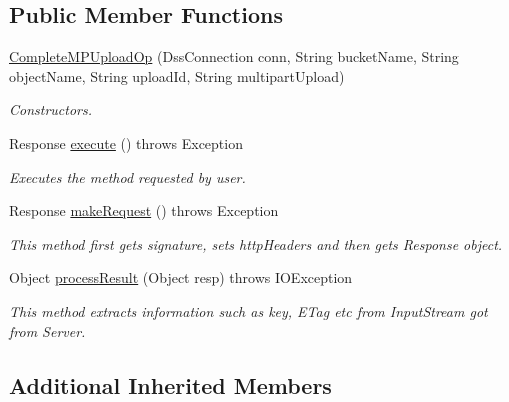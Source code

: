 \subsection*{Public Member Functions}
\begin{DoxyCompactItemize}
\item 
\hyperlink{classorg_1_1jcs_1_1dss_1_1op_1_1CompleteMPUploadOp_a8736c298c1dca59b038fd44ef2eec39a}{Complete\+M\+P\+Upload\+Op} (Dss\+Connection conn, String bucket\+Name, String object\+Name, String upload\+Id, String multipart\+Upload)\hypertarget{classorg_1_1jcs_1_1dss_1_1op_1_1CompleteMPUploadOp_a8736c298c1dca59b038fd44ef2eec39a}{}\label{classorg_1_1jcs_1_1dss_1_1op_1_1CompleteMPUploadOp_a8736c298c1dca59b038fd44ef2eec39a}

\begin{DoxyCompactList}\small\item\em Constructors. \end{DoxyCompactList}\item 
Response \hyperlink{classorg_1_1jcs_1_1dss_1_1op_1_1CompleteMPUploadOp_a24540ef77bd0fb6424888b3a6ea2b223}{execute} ()  throws Exception 
\begin{DoxyCompactList}\small\item\em Executes the method requested by user. \end{DoxyCompactList}\item 
Response \hyperlink{classorg_1_1jcs_1_1dss_1_1op_1_1CompleteMPUploadOp_adefa48266f195cbd6baf6d6dd6d093f3}{make\+Request} ()  throws Exception 
\begin{DoxyCompactList}\small\item\em This method first gets signature, sets http\+Headers and then gets Response object. \end{DoxyCompactList}\item 
Object \hyperlink{classorg_1_1jcs_1_1dss_1_1op_1_1CompleteMPUploadOp_a9a5e5ba31cea414e044dce4ba51b3b64}{process\+Result} (Object resp)  throws I\+O\+Exception
\begin{DoxyCompactList}\small\item\em This method extracts information such as key, E\+Tag etc from Input\+Stream got from Server. \end{DoxyCompactList}\end{DoxyCompactItemize}
\subsection*{Additional Inherited Members}


